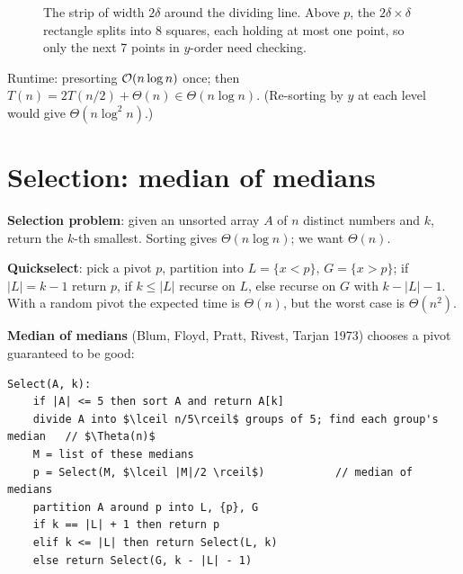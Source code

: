 \begin{figure}[H]
\centering
{}
\caption{The strip of width $2\delta$ around the dividing line. Above $p$,
the $2\delta\times\delta$ rectangle splits into 8 squares, each holding at
most one point, so only the next 7 points in $y$-order need checking.}
\end{figure}

Runtime: presorting $\mathcal{O}(n\log n)$ once; then $T(n)=2T(n/2)+\Theta(n)\in\Theta(n\log n)$.
(Re-sorting by $y$ at each level would give $\Theta(n\log^2n)$.)

\section{Selection: median of medians}
\textbf{Selection problem}: given an unsorted array $A$ of $n$ distinct numbers and $k$, return the $k$-th smallest.
Sorting gives $\Theta(n\log n)$; we want $\Theta(n)$.

\textbf{Quickselect}: pick a pivot $p$, partition into $L=\{x<p\}$, $G=\{x>p\}$; if $|L|=k-1$ return $p$,
if $k\le|L|$ recurse on $L$, else recurse on $G$ with $k-|L|-1$.
With a random pivot the expected time is $\Theta(n)$, but the worst case is $\Theta(n^2)$.

\textbf{Median of medians} (Blum, Floyd, Pratt, Rivest, Tarjan 1973) chooses a pivot guaranteed to be good:
\begin{lstlisting}[style=pseudo]
Select(A, k):
    if |A| <= 5 then sort A and return A[k]
    divide A into $\lceil n/5\rceil$ groups of 5; find each group's median   // $\Theta(n)$
    M = list of these medians
    p = Select(M, $\lceil |M|/2 \rceil$)           // median of medians
    partition A around p into L, {p}, G
    if k == |L| + 1 then return p
    elif k <= |L| then return Select(L, k)
    else return Select(G, k - |L| - 1)
\end{lstlisting}

